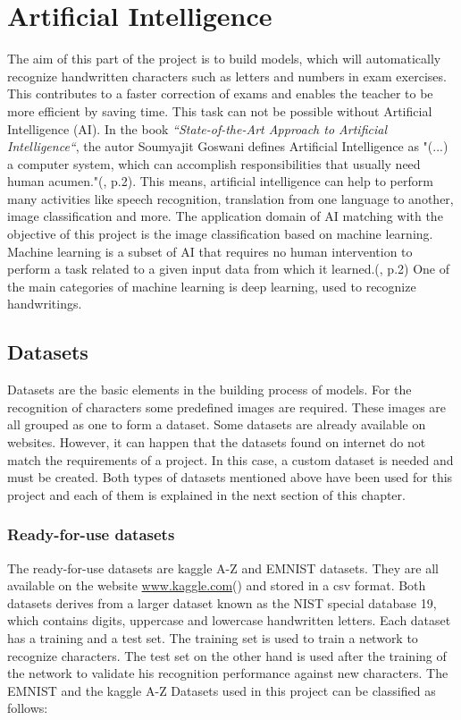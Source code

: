 \author{Bautrelle Fotso}
\graphicspath{ {./src/chapters/developer/media/}}

\chapter{Artificial Intelligence}
The aim of this part of the project is to build models, which will automatically recognize handwritten characters such as letters and numbers in exam 
exercises. This contributes to a faster correction of exams and enables the teacher to be more efficient by saving time.
This task can not be possible without Artificial Intelligence (AI).
In the book \emph{``State-of-the-Art Approach to Artificial Intelligence``}, the autor 
Soumyajit Goswani defines Artificial Intelligence as "(...) a computer system, which can accomplish responsibilities 
that usually need human acumen."(\cite{[1]}, p.2). 
This means, artificial intelligence can help to perform many activities like speech recognition, translation from one language to 
another, image classification and more. 
The application domain of AI matching with the objective of this project is the image classification based on machine learning.
Machine learning is a subset of AI that requires no human intervention to perform a task related to a given 
input data from which it learned.(\cite{[1]}, p.2)
One of the main categories of machine learning is deep learning, used to recognize handwritings. \hfill \break


\section{Datasets}
Datasets are the basic elements in the building process of models.
For the recognition of characters some predefined images are required. 
These images are all grouped as one to form a dataset.
Some datasets are already available on websites. 
However, it can happen that the datasets found on internet do not match the requirements of a project.
In this case, a custom dataset is needed and must be created.
\noindent
Both types of datasets mentioned above have been used for this project and each of them is explained in the next section of this chapter.

\subsection{Ready-for-use datasets}
The ready-for-use datasets are kaggle A-Z and EMNIST datasets. 
They are all available on the website \url{www.kaggle.com}(\cite{[2]}) and stored in a csv format. 
Both datasets derives from a larger dataset known as the NIST special
database 19, which contains digits, uppercase and lowercase handwritten letters. 
Each dataset has a training and a test set. 
The training set is used to train a network to recognize characters.
The test set on the other hand is used after the training of the network to validate his recognition performance against new characters. 
The EMNIST and the kaggle A-Z Datasets used in this project can be classified as follows:

